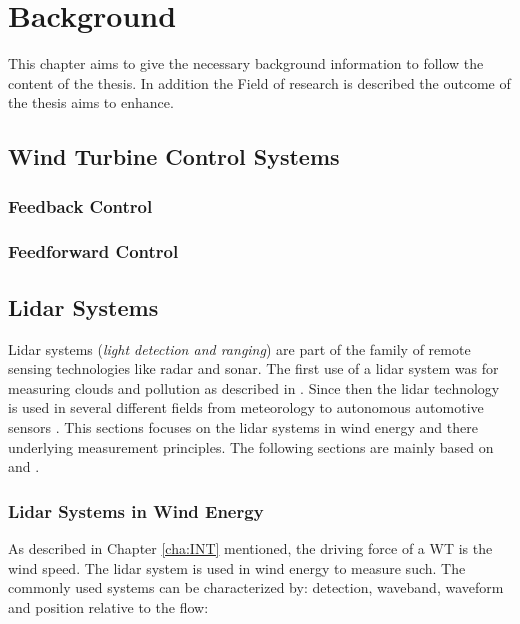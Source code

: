 \chapter{Background} \label{cha:Back}
This chapter aims to give the necessary background information to follow the content of the thesis. In addition the Field of research is described the outcome of the thesis aims to enhance.
\section{Wind Turbine Control Systems}\label{sec:ControlSys}




\subsection{Feedback Control}\label{subsec:FB-Contr}









\subsection{Feedforward Control}\label{subsec:FF-Contr}





\section{Lidar Systems}\label{sec:LidarSys}
Lidar systems (\textit{light detection and ranging}) are part of the family of remote sensing technologies like radar and sonar. The first use of a lidar system was for measuring clouds and pollution as described in \cite{Goyer1963}. Since then the \gls{lidar} technology is used in several different fields from meteorology \cite{Goyer1963} to autonomous automotive sensors \cite{EDN2016}. This sections focuses on the \gls{lidar} systems in wind energy and there underlying measurement principles. The following sections are mainly based on \cite{DTUlidar2013} and \cite{Schlipf2015}.

\subsection{Lidar Systems in Wind Energy}\label{subsec:LidarInWind}
As described in Chapter \ref{cha:INT} mentioned, the driving force of a \gls{WT} is the wind speed. The \gls{lidar} system is used in wind energy to measure such. The commonly used systems can be characterized by: detection, waveband, waveform and position relative to the flow:

